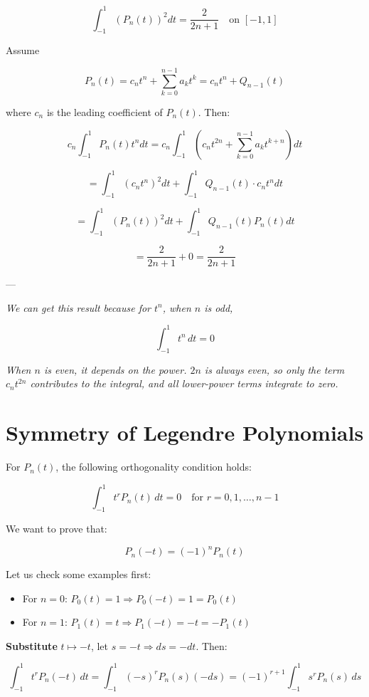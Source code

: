 \documentclass{article}
\begin{document}
\[
\int_{-1}^{1} \left( P_n(t) \right)^2 dt = \frac{2}{2n + 1} \quad \text{on } [-1, 1]
\]

Assume

\[
P_n(t) = c_n t^n + \sum_{k=0}^{n-1} a_k t^k = c_n t^n + Q_{n-1}(t)
\]

where \( c_n \) is the leading coefficient of \( P_n(t) \). Then:

\[
c_n \int_{-1}^{1} P_n(t) t^n dt = c_n \int_{-1}^{1} \left( c_n t^{2n} + \sum_{k=0}^{n-1} a_k t^{k+n} \right) dt
\]

\[
= \int_{-1}^{1} (c_n t^n)^2 dt + \int_{-1}^{1} Q_{n-1}(t) \cdot c_n t^n dt
\]

\[
= \int_{-1}^{1} \left( P_n(t) \right)^2 dt + \int_{-1}^{1} Q_{n-1}(t) P_n(t) dt
\]

\[
= \frac{2}{2n + 1} + 0 = \frac{2}{2n + 1}
\]

---

\textit{We can get this result because for \( t^n \), when \( n \) is odd,}

\[
\int_{-1}^{1} t^n \, dt = 0
\]

\textit{When \( n \) is even, it depends on the power. \( 2n \) is always even, so only the term \( c_n t^{2n} \) contributes to the integral, and all lower-power terms integrate to zero.}

\section*{Symmetry of Legendre Polynomials}

For \( P_n(t) \), the following orthogonality condition holds:

\[
\int_{-1}^{1} t^r P_n(t) \, dt = 0 \quad \text{for } r = 0, 1, \dots, n - 1
\]

We want to prove that:

\[
P_n(-t) = (-1)^n P_n(t)
\]

Let us check some examples first:

\begin{itemize}
  \item For \( n = 0 \): \( P_0(t) = 1 \Rightarrow P_0(-t) = 1 = P_0(t) \)
  \item For \( n = 1 \): \( P_1(t) = t \Rightarrow P_1(-t) = -t = -P_1(t) \)
\end{itemize}

\textbf{Substitute} \( t \mapsto -t \), let \( s = -t \Rightarrow ds = -dt \). Then:

\[
\int_{-1}^{1} t^r P_n(-t) \, dt = \int_{-1}^{1} (-s)^r P_n(s) (-ds)
= (-1)^{r+1} \int_{-1}^{1} s^r P_n(s) \, ds
\]
\end{document}
